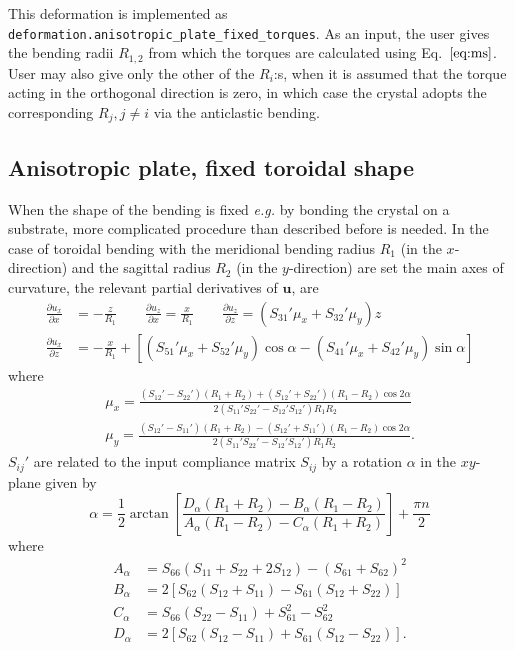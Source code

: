 \documentclass[11pt,a4paper]{article}
\begin{document}
This deformation is implemented as \texttt{deformation.anisotropic\_plate\_fixed\_torques}. As an input, the user gives the bending radii $R_{1,2}$ from which the torques are calculated using Eq.~$\eqref{eq:ms}$. User may also give only the other of the $R_i$:s, when it is assumed that the torque acting in the orthogonal direction is zero, in which case the crystal adopts the corresponding $R_j, j \neq i$ via the anticlastic bending.

\subsection{Anisotropic plate, fixed toroidal shape}
When the shape of the bending is fixed \emph{e.g.} by bonding the crystal on a substrate, more complicated procedure than described before is needed. In the case of toroidal bending with the meridional bending radius $R_1$ (in the $x$-direction) and the sagittal radius $R_2$ (in the $y$-direction) are set the main axes of curvature, the relevant partial derivatives of $\mathbf{u}$, are \cite{Honkanen_2020}
\begin{align}
\frac{\partial u_x}{\partial x} &= - \frac{z}{R_1} \qquad
\frac{\partial u_z}{\partial x} = \frac{x}{R_1} \qquad
\frac{\partial u_z}{\partial z} = \left(S_{31}' \mu_x + S_{32}' \mu_y \right) z \nonumber \\
\frac{\partial u_x}{\partial z} &= -\frac{x}{R_1} + \left[ 
\left(S_{51}' \mu_x + S_{52}' \mu_y \right) \cos \alpha
- \left(S_{41}' \mu_x + S_{42}' \mu_y \right) \sin \alpha
\right]
\end{align} 
where
\begin{align}
\mu_x = \frac{(S_{12}' - S_{22}')(R_1 + R_2) + (S_{12}' + S_{22}')(R_1 - R_2)\cos 2 \alpha}{2(S_{11}'S_{22}'  - S_{12}'S_{12}')R_1 R_2}\\
\mu_y = \frac{(S_{12}' - S_{11}')(R_1 + R_2) - (S_{12}' + S_{11}')(R_1 - R_2)\cos 2 \alpha}{2(S_{11}'S_{22}'  - S_{12}'S_{12}')R_1 R_2}.
\end{align}
$S_{ij}'$ are related to the input compliance matrix $S_{ij}$ by a rotation $\alpha$ in the $xy$-plane given by
\begin{equation}
\alpha = \frac{1}{2} \arctan \left[ \frac{D_\alpha(R_1 + R_2) - B_\alpha (R_1 - R_2)}{ A_\alpha (R_1 - R_2) - C_\alpha (R_1 + R_2) } \right] + \frac{\pi n}{2}
\end{equation}
where
\begin{align}
A_\alpha &= S_{66} (S_{11} + S_{22} + 2 S_{12}) - (S_{61} + S_{62})^2 \\
B_\alpha &=  2\left[S_{62} (S_{12} + S_{11}) - S_{61} (S_{12} + S_{22}) \right]   \\
C_\alpha &= S_{66} (S_{22} - S_{11}) + S_{61}^2 - S_{62}^2  \\
D_\alpha &= 2\left[S_{62} (S_{12} - S_{11}) + S_{61} (S_{12} - S_{22}) \right].
\end{align}
\end{document}
